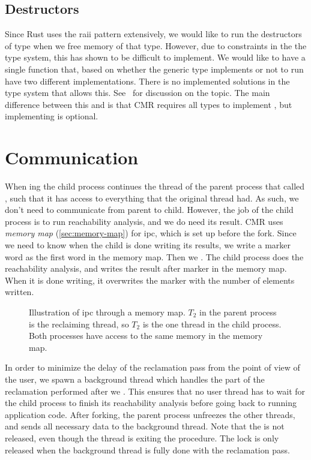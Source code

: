 \subsection{Destructors}

Since Rust uses the \gls{raii} pattern extensively, we would like to run the destructors of type
when we free memory of that type. However, due to constraints in the the type system, this has
shown to be difficult to implement. We would like to have a single function  that,
based on whether the generic type  implements  or not to run have two different
implementations. There is no implemented solutions in the type system that allows this.
See~\cite{rust-impl-overlap} for discussion on the topic.
The main difference between this and  is that CMR requires all types to implement
, but implementing  is optional.



\section{Communication\label{sec:impl-communication}}

When ing the child process continues the thread of the parent process that called
, such that it has access to everything that the original thread had.
As such, we don't need to communicate from parent to child. However, the job of the child process
is to run reachability analysis, and we do need its result. CMR uses \emph{memory map}
(\cref{sec:memory-map}) for \gls{ipc}\@, which is set up before the fork. Since we need to
know when the child is done writing its results, we write a marker word as the first word in
the memory map. Then we . The child process does the reachability analysis, and
writes the result after marker in the memory map. When it is done writing, it overwrites the marker
with the number of elements written.

\begin{figure}[ht]
  \centering
  
  \caption{Illustration of \gls{ipc} through a memory map. $T_2$ in the parent process is the
  reclaiming thread, so $T_2$ is the one thread in the child process. Both processes have
  access to the same memory in the memory map.}
\end{figure}

In order to minimize the delay of the reclamation pass from the point of view of the user, we spawn
a background thread which handles the part of the reclamation performed after we .
This ensures that no user thread has to wait for the child process to finish its reachability
analysis before going back to running application code.  After forking, the parent process
unfreezes the other threads, and sends all necessary data to the background thread. Note that the
 is not released, even though the thread is exiting the procedure. The lock is
only released when the background thread is fully done with the reclamation pass.



